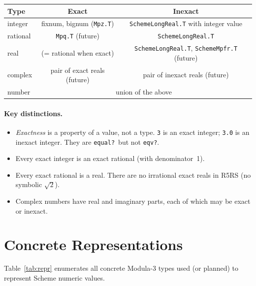 \documentclass[12pt]{article}
\begin{document}
\begin{center}
\begin{tabular}{lcc}
\toprule
\textbf{Type} & \textbf{Exact} & \textbf{Inexact} \\
\midrule
integer   & fixnum, bignum ({\tt Mpz.T}) & {\tt SchemeLongReal.T} with integer value \\
rational  & {\tt Mpq.T} (future) & {\tt SchemeLongReal.T} \\
real      & (= rational when exact) & {\tt SchemeLongReal.T}, {\tt SchemeMpfr.T} (future) \\
complex   & pair of exact reals (future) & pair of inexact reals (future) \\
number    & \multicolumn{2}{c}{union of the above} \\
\bottomrule
\end{tabular}
\end{center}

\paragraph{Key distinctions.}
\begin{itemize}[nosep]
\item \emph{Exactness} is a property of a value, not a type.
  {\tt 3} is an exact integer; {\tt 3.0} is an inexact integer.
  They are {\tt equal?}\ but not {\tt eqv?}.
\item Every exact integer is an exact rational (with denominator~1).
\item Every exact rational is a real.  There are no irrational exact
  reals in R5RS (no symbolic $\sqrt{2}$).
\item Complex numbers have real and imaginary parts, each of which
  may be exact or inexact.
\end{itemize}

\section{Concrete Representations}
\label{sec:representations}

Table~\ref{tab:repr} enumerates all concrete Modula-3 types used
(or planned) to represent Scheme numeric values.
\end{document}
